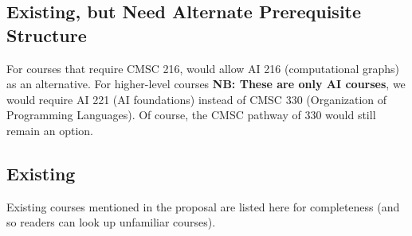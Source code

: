 \documentclass[
10pt, %
a4paper, %
oneside, %
headinclude,footinclude, %
BCOR5mm, %
]{scrartcl}
\begin{document}
  


    \subsection{Existing, but Need Alternate Prerequisite Structure}

    For courses that require CMSC 216, would allow AI 216 (computational graphs) as an alternative.  For higher-level courses \textbf{NB: These are only AI courses}, we would require AI 221 (AI foundations) instead of CMSC 330 (Organization of Programming Languages).  Of course, the CMSC pathway of 330 would still remain an option.

    

  \subsection{Existing}

    Existing courses mentioned in the proposal are listed here for completeness (and so readers can look up unfamiliar courses).  

  
  
  



%






% 


\end{document}
